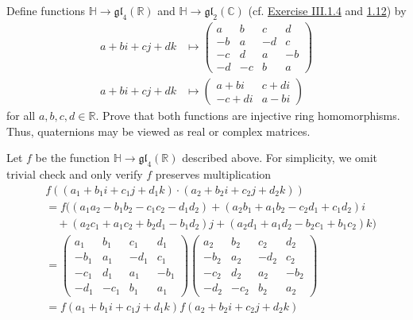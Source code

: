 \documentclass[12pt,letterpaper,boxed]{hmcpset}
\newcommand{\R}{\mathbb{R}}
\begin{document}
\hypertarget{Exercise III.2.4}{}
\begin{problem}[2.4]
	Define functions $\mathbb{H} \rightarrow \mathfrak{g l}_{4}(\mathbb{R})$ and $\mathbb{H} \rightarrow \mathfrak{g l}_{2}(\mathbb{C})$ (cf. \hyperlink{Exercise III.1.4}{Exercise III.1.4} and \hyperlink{Exercise III.1.4}{1.12}) by
	\begin{align*}
	a+b i+c j+d k& \longmapsto\left(\begin{array}{cccc}{a} & {b} & {c} & {d} \\ {-b} & {a} & {-d} & {c} \\ {-c} & {d} & {a} & {-b} \\ {-d} & {-c} & {b} & {a}\end{array}\right)\\
	a+b i+c j+d k &\longmapsto\left(\begin{array}{cc}{a+b i} & {c+d i} \\ {-c+d i} & {a-b i}\end{array}\right)
	\end{align*}
	for all $a, b, c, d \in\R$. Prove that both functions are injective ring homomorphisms.
	Thus, quaternions may be viewed as real or complex matrices.
\end{problem}
\begin{solution}
	Let $f$ be the function $\mathbb{H} \rightarrow \mathfrak{g l}_{4}(\mathbb{R})$ described above. For simplicity, we omit trivial check and only verify $f$ preserves multiplication
	\begin{align*}
	&f((a_1+b_1i+c_1j+d_1k)\cdot(a_2+b_2i+c_2j+d_2k))\\
	&=f((a_1 a_2-b_1 b_2-c_1 c_2-d_1 d_2)+(a_2
	b_1+a_1 b_2-c_2 d_1+c_1 d_2)i\\
	&\hspace{1em}+(a_2 c_1+a_1 c_2+b_2 d_1-b_1
	d_2)j+(a_2 d_1+a_1 d_2-b_2 c_1+b_1 c_2)k)\\
	&=\left(\begin{array}{cccc}{a_1} & {b_1} & {c_1} & {d_1} \\ {-b_1} & {a_1} & {-d_1} & {c_1} \\ {-c_1} & {d_1} & {a_1} & {-b_1} \\ {-d_1} & {-c_1} & {b_1} & {a_1}\end{array}\right)
	\left(\begin{array}{cccc}{a_2} & {b_2} & {c_2} & {d_2} \\ {-b_2} & {a_2} & {-d_2} & {c_2} \\ {-c_2} & {d_2} & {a_2} & {-b_2} \\ {-d_2} & {-c_2} & {b_2} & {a_2}\end{array}\right)\\
	&=f(a_1+b_1i+c_1j+d_1k)f(a_2+b_2i+c_2j+d_2k)
	\end{align*}
\end{solution}
\end{document}
